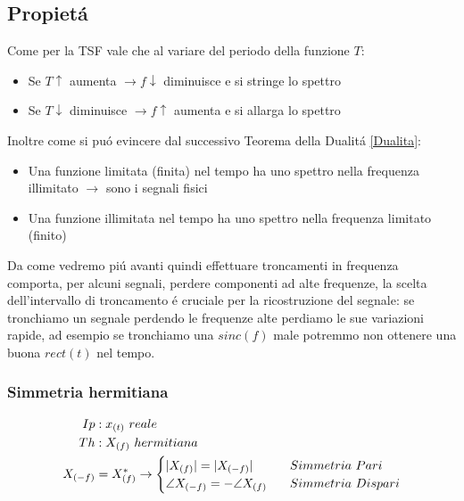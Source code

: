     \subsection{Propietá}
        Come per la TSF vale che al variare del periodo della funzione $T$:
            \begin{itemize}
                \item Se $T\uparrow$ aumenta $ \rightarrow f\downarrow$ diminuisce e si stringe lo spettro  
                \item Se $T\downarrow$ diminuisce $ \rightarrow f\uparrow$ aumenta e si allarga lo spettro  
            \end{itemize}
        Inoltre come si puó evincere dal successivo Teorema della Dualitá \ref{Dualita}:
            \begin{itemize}
                \item Una funzione limitata (finita) nel tempo ha uno spettro nella frequenza illimitato $\rightarrow$ sono i segnali fisici   
                \item Una funzione illimitata nel tempo ha uno spettro nella frequenza limitato (finito)
            \end{itemize}
        Da come vedremo piú avanti quindi effettuare troncamenti in frequenza comporta, per alcuni segnali, perdere componenti ad alte
        frequenze, la scelta dell'intervallo di troncamento é cruciale per la ricostruzione del segnale: se tronchiamo un segnale perdendo
        le frequenze alte perdiamo le sue variazioni rapide, ad esempio se tronchiamo una $sinc(f)$ male potremmo non ottenere una buona $rect(t)$
        nel tempo.
        \subsubsection{Simmetria hermitiana}\label{Simmetria Hermitiana}
            \begin{align}
                Ip&: x_{(t)}\ reale \nonumber \\
                Th&: X_{(f)}\ hermitiana \nonumber \\ 
                X_{(-f)} &= X_{(f)}^{*} \rightarrow
                    \begin{cases}
                        |X_{(f)}| = |X_{(-f)}| \hspace{0.3cm} & Simmetria\ Pari \\
                        \angle X_{(-f)} = -\angle X_{(f)}\hspace{0.3cm} & Simmetria\ Dispari
                    \end{cases} \nonumber
            \end{align}

